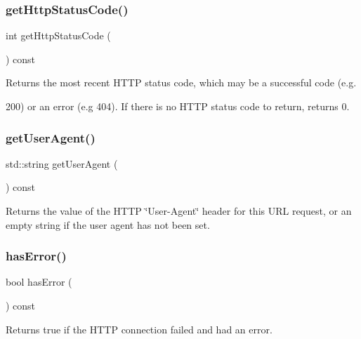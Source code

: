 \subsubsection{\texorpdfstring{get\+Http\+Status\+Code()}{getHttpStatusCode()}}
{\footnotesize\ttfamily int get\+Http\+Status\+Code (\begin{DoxyParamCaption}{ }\end{DoxyParamCaption}) const}



Returns the most recent H\+T\+TP status code, which may be a successful code (e.\+g. 

200) or an error (e.\+g 404). If there is no H\+T\+TP status code to return, returns 0. \mbox{\label{classsgl_1_1GDownloader_a479f109234aad1c792be804bf6320c62}} 
\subsubsection{\texorpdfstring{get\+User\+Agent()}{getUserAgent()}}
{\footnotesize\ttfamily std\+::string get\+User\+Agent (\begin{DoxyParamCaption}{ }\end{DoxyParamCaption}) const}



Returns the value of the H\+T\+TP \char`\"{}\+User-\/\+Agent\char`\"{} header for this U\+RL request, or an empty string if the user agent has not been set. 

\mbox{\label{classsgl_1_1GDownloader_a81dd125e253592aaef5fea33dfc50c42}} 
\subsubsection{\texorpdfstring{has\+Error()}{hasError()}}
{\footnotesize\ttfamily bool has\+Error (\begin{DoxyParamCaption}{ }\end{DoxyParamCaption}) const}



Returns true if the H\+T\+TP connection failed and had an error. 

